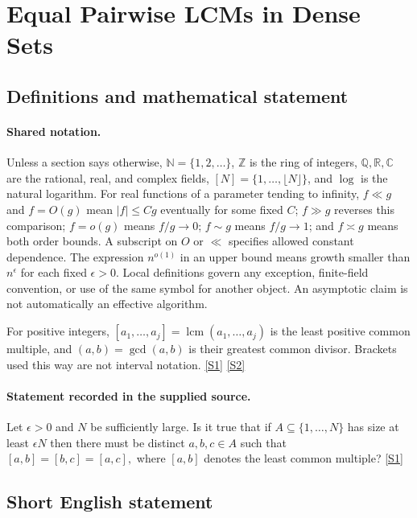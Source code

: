 \documentclass[11pt,a4paper]{article}
\newcommand{\N}{\mathbb{N}}
\newcommand{\Z}{\mathbb{Z}}
\newcommand{\Q}{\mathbb{Q}}
\newcommand{\R}{\mathbb{R}}
\newcommand{\C}{\mathbb{C}}
\newcommand{\sref}[2]{\hyperlink{source:#1:#2}{[S#2]}}
\begin{document}
\section{Equal Pairwise LCMs in Dense Sets}\label{statement}


\subsection{Definitions and mathematical statement}

\paragraph{Shared notation.}Unless a section says otherwise, $\N=\{1,2,\ldots\}$,
$\Z$ is the ring of integers, $\Q,\R,\C$ are the rational, real, and complex
fields, $[N]=\{1,\ldots,\lfloor N\rfloor\}$, and $\log$ is the natural
logarithm. For real functions of a parameter tending to infinity,
$f\ll g$ and $f=O(g)$ mean $|f|\leq Cg$ eventually for some fixed $C$;
$f\gg g$ reverses this comparison; $f=o(g)$ means $f/g\to0$;
$f\sim g$ means $f/g\to1$; and $f\asymp g$ means both order bounds.
A subscript on $O$ or $\ll$ specifies allowed constant dependence.
The expression $n^{o(1)}$ in an upper bound means growth smaller than
$n^\epsilon$ for each fixed $\epsilon>0$. Local definitions govern any
exception, finite-field convention, or use of the same symbol for another
object. An asymptotic claim is not automatically an effective algorithm.



For positive integers, $[a_1,\ldots,a_j]=\operatorname{lcm}(a_1,\ldots,a_j)$ is the least positive common multiple, and $(a,b)=\gcd(a,b)$ is their greatest common divisor. Brackets used this way are not interval notation. \sref{statement}{1} \sref{statement}{2}

\paragraph{Statement recorded in the supplied source.}
Let $\epsilon>0$ and $N$ be sufficiently large. Is it true that if $A\subseteq \{1,\ldots,N\}$ has size at least $\epsilon N$ then there must be distinct $a,b,c\in A$ such that $ [a,b]=[b,c]=[a,c], $ where $[a,b]$ denotes the least common multiple? \sref{statement}{1}

\subsection{Short English statement}
\end{document}
